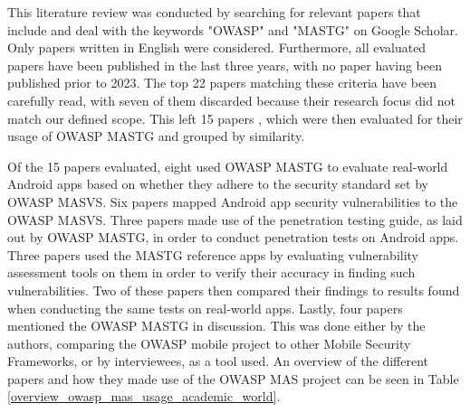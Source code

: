 This literature review was conducted by searching for relevant papers that include and deal with the keywords "OWASP" and "MASTG" on Google Scholar. Only papers written in English were considered. Furthermore, all evaluated papers have been published in the last three years, with no paper having been published prior to 2023. The top 22 papers matching these criteria have been carefully read, with seven of them discarded because their research focus did not match our defined scope. This left 15 papers \citep{paper_01, paper_02, paper_03, paper_04, paper_05, paper_06, paper_07, paper_08, paper_10, paper_13, paper_14, paper_19, paper_20, paper_21, paper_22}, which were then evaluated for their usage of OWASP MASTG and grouped by similarity.

Of the 15 papers evaluated, eight \citep{paper_01, paper_02, paper_03, paper_04, paper_05, paper_07, paper_13, paper_14} used OWASP MASTG to evaluate real-world Android apps based on whether they adhere to the security standard set by OWASP MASVS. Six papers \citep{paper_01, paper_02, paper_03, paper_04, paper_05, paper_07} mapped Android app security vulnerabilities to the OWASP MASVS. Three papers \citep{paper_03, paper_04, paper_06} made use of the penetration testing guide, as laid out by OWASP MASTG, in order to conduct penetration tests on Android apps. Three papers \citep{paper_10, paper_19, paper_22} used the MASTG reference apps by evaluating vulnerability assessment tools on them in order to verify their accuracy in finding such vulnerabilities. Two of these papers \citep{paper_19, paper_22} then compared their findings to results found when conducting the same tests on real-world apps. Lastly, four papers \citep{paper_08, paper_20, paper_21, paper_22} mentioned the OWASP MASTG in discussion. This was done either by the authors, comparing the OWASP mobile project to other Mobile Security Frameworks, or by interviewees, as a tool used. An overview of the different papers and how they made use of the OWASP MAS project can be seen in Table \ref{overview_owasp_mas_usage_academic_world}.

